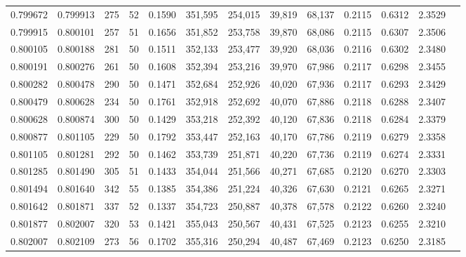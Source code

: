 \begin{tabular}{rrrrrrrrrrrrr}
0.799672 & 0.799913 &   275 &  52 &                                     0.1590 & 351,595 & 254,015 &  39,819 &  68,137 & 0.2115 & 0.6312 & 2.3529 \\
0.799915 & 0.800101 &   257 &  51 &                                     0.1656 & 351,852 & 253,758 &  39,870 &  68,086 & 0.2115 & 0.6307 & 2.3506 \\
0.800105 & 0.800188 &   281 &  50 &                                     0.1511 & 352,133 & 253,477 &  39,920 &  68,036 & 0.2116 & 0.6302 & 2.3480 \\
0.800191 & 0.800276 &   261 &  50 &                                     0.1608 & 352,394 & 253,216 &  39,970 &  67,986 & 0.2117 & 0.6298 & 2.3455 \\
0.800282 & 0.800478 &   290 &  50 &                                     0.1471 & 352,684 & 252,926 &  40,020 &  67,936 & 0.2117 & 0.6293 & 2.3429 \\
0.800479 & 0.800628 &   234 &  50 &                                     0.1761 & 352,918 & 252,692 &  40,070 &  67,886 & 0.2118 & 0.6288 & 2.3407 \\
0.800628 & 0.800874 &   300 &  50 &                                     0.1429 & 353,218 & 252,392 &  40,120 &  67,836 & 0.2118 & 0.6284 & 2.3379 \\
0.800877 & 0.801105 &   229 &  50 &                                     0.1792 & 353,447 & 252,163 &  40,170 &  67,786 & 0.2119 & 0.6279 & 2.3358 \\
0.801105 & 0.801281 &   292 &  50 &                                     0.1462 & 353,739 & 251,871 &  40,220 &  67,736 & 0.2119 & 0.6274 & 2.3331 \\
0.801285 & 0.801490 &   305 &  51 &                                     0.1433 & 354,044 & 251,566 &  40,271 &  67,685 & 0.2120 & 0.6270 & 2.3303 \\
0.801494 & 0.801640 &   342 &  55 &                                     0.1385 & 354,386 & 251,224 &  40,326 &  67,630 & 0.2121 & 0.6265 & 2.3271 \\
0.801642 & 0.801871 &   337 &  52 &                                     0.1337 & 354,723 & 250,887 &  40,378 &  67,578 & 0.2122 & 0.6260 & 2.3240 \\
0.801877 & 0.802007 &   320 &  53 &                                     0.1421 & 355,043 & 250,567 &  40,431 &  67,525 & 0.2123 & 0.6255 & 2.3210 \\
0.802007 & 0.802109 &   273 &  56 &                                     0.1702 & 355,316 & 250,294 &  40,487 &  67,469 & 0.2123 & 0.6250 & 2.3185 \\

\end{tabular}
